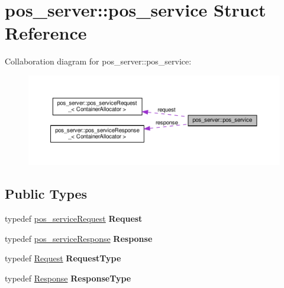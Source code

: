 \hypertarget{structpos__server_1_1pos__service}{}\section{pos\+\_\+server\+:\+:pos\+\_\+service Struct Reference}
\label{structpos__server_1_1pos__service}


Collaboration diagram for pos\+\_\+server\+:\+:pos\+\_\+service\+:
\nopagebreak
\begin{figure}[H]
\begin{center}
\leavevmode
\includegraphics[width=350pt]{structpos__server_1_1pos__service__coll__graph}
\end{center}
\end{figure}
\subsection*{Public Types}
\begin{DoxyCompactItemize}
\item 
\mbox{\label{structpos__server_1_1pos__service_a0e8f0283d52e287213d3fb1fd5f3e022}} 
typedef \hyperlink{structpos__server_1_1pos__serviceRequest__}{pos\+\_\+service\+Request} {\bfseries Request}
\item 
\mbox{\label{structpos__server_1_1pos__service_a03f524afbbebcf281b9f844759a7434a}} 
typedef \hyperlink{structpos__server_1_1pos__serviceResponse__}{pos\+\_\+service\+Response} {\bfseries Response}
\item 
\mbox{\label{structpos__server_1_1pos__service_a4347a6694a1704fce71be245fd0fe8c8}} 
typedef \hyperlink{structpos__server_1_1pos__serviceRequest__}{Request} {\bfseries Request\+Type}
\item 
\mbox{\label{structpos__server_1_1pos__service_a528dce4adf07534de5cd4f894117b821}} 
typedef \hyperlink{structpos__server_1_1pos__serviceResponse__}{Response} {\bfseries Response\+Type}
\end{DoxyCompactItemize}
